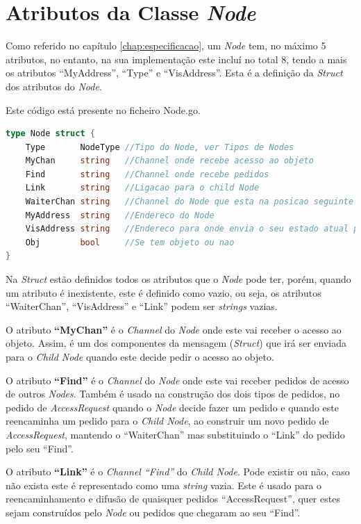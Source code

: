 \section{Atributos da Classe \emph{Node}}
\label{implementacao:sec:atributos_class}
Como referido no capítulo \ref{chap:especificacao}, um \emph{Node} tem, no máximo 5 atributos, no entanto, na sua implementação este incluí no total 8, tendo a mais os atributos ``MyAddress'', ``Type'' e ``VisAddress''.
Esta é a definição da \emph{Struct} dos atributos do \emph{Node}.


Este código está presente no ficheiro Node.go.


\begin{lstlisting}[caption={Definição da estrutura \emph{Node}},language=Go]
type Node struct {
	Type       NodeType //Tipo do Node, ver Tipos de Nodes
	MyChan     string   //Channel onde recebe acesso ao objeto
	Find       string   //Channel onde recebe pedidos
	Link       string   //Ligacao para o child Node
	WaiterChan string   //Channel do Node que esta na posicao seguinte da fila
	MyAddress  string   //Endereco do Node
	VisAddress string   //Endereco para onde envia o seu estado atual para a atualizacao da visualizacao
	Obj        bool     //Se tem objeto ou nao 
}

\end{lstlisting}
Na \emph{Struct} estão definidos todos os atributos que o \emph{Node} pode ter, porém, quando um atributo é inexistente, este é definido como vazio, ou seja, os atributos ``WaiterChan'', ``VisAddress'' e ``Link'' podem ser \emph{strings} vazias.

O atributo \textbf{``MyChan''} é o \emph{Channel} do \emph{Node} onde este vai receber o acesso ao objeto.
Assim, é um dos componentes da mensagem (\emph{Struct}) que irá ser enviada para o \emph{Child Node} quando este decide pedir o acesso ao objeto.

O atributo \textbf{``Find''} é o \emph{Channel} do \emph{Node} onde este vai receber pedidos de acesso de outros \emph{Nodes}. 
Também é usado na construção dos dois tipos de pedidos, no pedido de \emph{AccessRequest} quando o \emph{Node} decide fazer um pedido e quando este reencaminha um pedido para o \emph{Child Node}, ao construir um novo pedido de \emph{AccessRequest}, mantendo o ``WaiterChan'' mas substituindo o ``Link'' do pedido pelo seu ``Find''.

O atributo \textbf{``Link''} é o \emph{Channel ``Find''} do \emph{Child Node}. Pode existir ou não, caso não exista este é representado como uma \emph{string} vazia.
Este é usado para o reencaminhamento e difusão de quaisquer pedidos ``AccessRequest'', quer estes sejam construídos pelo \emph{Node} ou pedidos que chegaram ao seu ``Find''.

